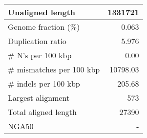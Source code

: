 \documentclass[12pt,a4paper]{article}
\begin{document}
\begin{table}[ht]
\begin{center}
\begin{tabular}{|l*{1}{|r}|}
Unaligned length & 1331721 \\ \hline
Genome fraction (\%) & 0.063 \\ \hline
Duplication ratio & 5.976 \\ \hline
\# N's per 100 kbp & 0.00 \\ \hline
\# mismatches per 100 kbp & 10798.03 \\ \hline
\# indels per 100 kbp & 205.68 \\ \hline
Largest alignment & 573 \\ \hline
Total aligned length & 27390 \\ \hline
NGA50 & - \\ \hline
\end{tabular}
\end{center}
\end{table}
\end{document}
